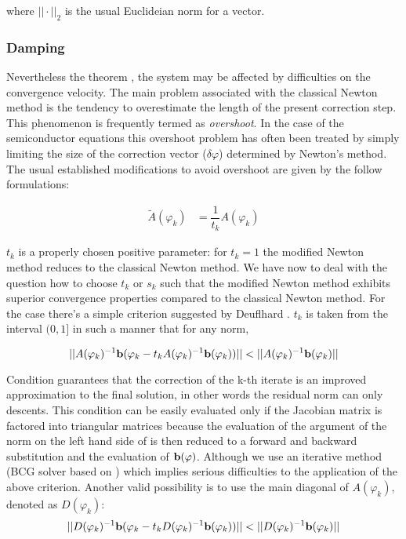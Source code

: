 where $||\cdot ||_2$ is the usual Euclideian norm for a vector.
\subsubsection{Damping}

Nevertheless the theorem , the system  may be affected by difficulties on the convergence velocity.
The main problem associated with the classical Newton method is the tendency to overestimate the length of the present correction step. This phenomenon is frequently termed as \textit{overshoot}. In the case of the semiconductor equations this overshoot problem has often been treated by simply limiting the size of the correction vector ($\delta \varphi$) determined by Newton's method. The usual established modifications to avoid overshoot are given by the follow formulations:


\begin{align}
\tilde{A}(\varphi_k)&=\dfrac{1}{t_k}A(\varphi_k) \label{eq: NLP mod used}
\end{align}

$t_k$ is a properly chosen positive parameter: for $t_k=1$ the modified Newton method reduces to the classical Newton method. We have now to deal with the question how to choose $t_k$ or $s_k$ such that the modified Newton method exhibits superior convergence properties compared to the classical Newton method.
For the case  there's a simple criterion suggested by Deuflhard \cite{DefulhardDamp}. $t_k$ is taken from the interval $(0,1]$ in such a manner that for any norm,

\begin{equation}
\label{eq: extended criterion}
||A(\varphi_k)^{-1}\vect{b}(\varphi_k-t_kA(\varphi_k)^{-1}\vect{b}(\varphi_k))||<||A(\varphi_k)^{-1}\vect{b}(\varphi_k)||
\end{equation}

Condition  guarantees that the correction of the k-th iterate is an improved approximation to the final solution, in other words the residual norm can only descents.
This condition can be easily evaluated only if the Jacobian matrix is factored into triangular matrices because the evaluation of the argument of the norm on the left hand side of  is then reduced to a forward and backward substitution and the evaluation of $\mathbf{b}(\varphi)$. Although we use an iterative method (BCG solver based on \cite{NumericalRecipes}) which implies serious difficulties to the application of the above criterion. Another valid possibility is to use the main diagonal of $A(\varphi_k)$, denoted as $D(\varphi_k)$:
\begin{equation}
\label{eq: easy criterion}
||D(\varphi_k)^{-1}\vect{b}(\varphi_k-t_kD(\varphi_k)^{-1}\vect{b}(\varphi_k))||<||D(\varphi_k)^{-1}\vect{b}(\varphi_k)||
\end{equation}

